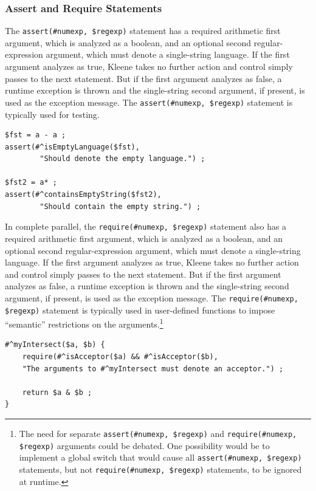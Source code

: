 \documentclass[letterpaper,12pt]{article}
\begin{document}
\subsubsection{Assert and Require Statements}

The \verb!assert(#numexp, $regexp)! statement has a required arithmetic first
argument, which is analyzed as a boolean, and an optional second
regular-expression argument, which must denote a single-string language.  If
the first argument analyzes as true, Kleene takes no further action and control simply passes to the next
statement.  But if the first argument analyzes as false, a runtime exception is thrown and
the single-string second argument, if present, is used as the exception
message.  The \verb!assert(#numexp, $regexp)! statement is typically used
for testing.

\begin{Verbatim}[fontsize=\small]
$fst = a - a ;
assert(#^isEmptyLanguage($fst), 
        "Should denote the empty language.") ;

$fst2 = a* ;
assert(#^containsEmptyString($fst2), 
        "Should contain the empty string.") ;
\end{Verbatim}

In complete parallel, the \verb!require(#numexp, $regexp)! statement also has a required arithmetic first
argument, which is analyzed as a boolean, and an optional second
regular-expression argument, which must denote a single-string language.  If
the first argument analyzes as true, Kleene takes no further action and control simply passes to the next
statement.  But if the first argument analyzes as false, a runtime exception is thrown and
the single-string second argument, if present, is used as the exception
message.  The \verb!require(#numexp, $regexp)! statement is typically used
in user-defined functions to impose ``semantic'' restrictions on the
arguments.\footnote{The need for separate \verb!assert(#numexp, $regexp)!
and \verb!require(#numexp, $regexp)! arguments could be debated.  One
possibility would be to implement a global switch that would cause all
\verb!assert(#numexp, $regexp)! statements, but not 
\verb!require(#numexp, $regexp)! statements, to be ignored at runtime.}

\begin{Verbatim}[fontsize=\small]
#^myIntersect($a, $b) {
	require(#^isAcceptor($a) && #^isAcceptor($b), 
    "The arguments to #^myIntersect must denote an acceptor.") ;

	return $a & $b ;
}
\end{Verbatim}
\end{document}
